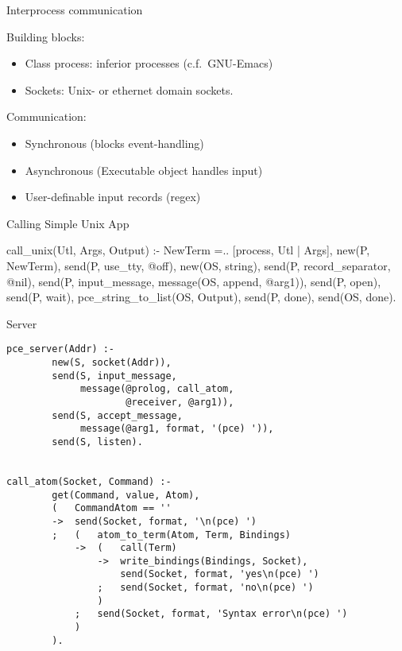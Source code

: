 \begin{sli}{Interprocess communication}

Building blocks:

\begin{itemize}
    \item Class process: inferior processes (c.f.\ GNU-Emacs)
    \item Sockets: Unix- or ethernet domain sockets.
\end{itemize}

Communication:

\begin{itemize}
    \item Synchronous (blocks event-handling)
    \item Asynchronous (Executable object handles input)
    \item User-definable input records (regex)
\end{itemize}
\end{sli}


\begin{sli}{Calling Simple Unix App}

\begin{code}
call_unix(Utl, Args, Output) :-
        NewTerm =.. [process, Utl | Args],
        new(P, NewTerm),
        send(P, use_tty, @off),
        new(OS, string),
        send(P, record_separator, @nil),
        send(P, input_message,
             message(OS, append, @arg1)),
        send(P, open),
        send(P, wait),
        pce_string_to_list(OS, Output),
        send(P, done),
        send(OS, done).
\end{code}

\noindent
\end{sli}


\begin{sli}{Server}
\begin{verbatim}
pce_server(Addr) :-
        new(S, socket(Addr)),
        send(S, input_message,
             message(@prolog, call_atom,
                     @receiver, @arg1)),
        send(S, accept_message,
             message(@arg1, format, '(pce) ')),
        send(S, listen).


call_atom(Socket, Command) :-
        get(Command, value, Atom),
        (   CommandAtom == ''
        ->  send(Socket, format, '\n(pce) ')
        ;   (   atom_to_term(Atom, Term, Bindings)
            ->  (   call(Term)
                ->  write_bindings(Bindings, Socket),
                    send(Socket, format, 'yes\n(pce) ')
                ;   send(Socket, format, 'no\n(pce) ')
                )
            ;   send(Socket, format, 'Syntax error\n(pce) ')
            )
        ).
\end{verbatim}

\noindent
\end{sli}


